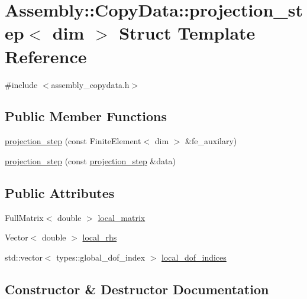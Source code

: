\hypertarget{struct_assembly_1_1_copy_data_1_1projection__step}{}\section{Assembly\+:\+:Copy\+Data\+:\+:projection\+\_\+step$<$ dim $>$ Struct Template Reference}
\label{struct_assembly_1_1_copy_data_1_1projection__step}


{\ttfamily \#include $<$assembly\+\_\+copydata.\+h$>$}

\subsection*{Public Member Functions}
\begin{DoxyCompactItemize}
\item 
\hyperlink{struct_assembly_1_1_copy_data_1_1projection__step_ae9dbb67f437af3436e16fa0f1b4939a4}{projection\+\_\+step} (const Finite\+Element$<$ dim $>$ \&fe\+\_\+auxilary)
\item 
\hyperlink{struct_assembly_1_1_copy_data_1_1projection__step_a3ee7e60d299b6a599cb7a3e87258ed69}{projection\+\_\+step} (const \hyperlink{struct_assembly_1_1_copy_data_1_1projection__step}{projection\+\_\+step} \&data)
\end{DoxyCompactItemize}
\subsection*{Public Attributes}
\begin{DoxyCompactItemize}
\item 
Full\+Matrix$<$ double $>$ \hyperlink{struct_assembly_1_1_copy_data_1_1projection__step_afd29a90013688a947f0100bd4541e1d1}{local\+\_\+matrix}
\item 
Vector$<$ double $>$ \hyperlink{struct_assembly_1_1_copy_data_1_1projection__step_afe718ce6054f5dc781f60bdc2b1bdc82}{local\+\_\+rhs}
\item 
std\+::vector$<$ types\+::global\+\_\+dof\+\_\+index $>$ \hyperlink{struct_assembly_1_1_copy_data_1_1projection__step_a96eade218526cf002d141d536572b75d}{local\+\_\+dof\+\_\+indices}
\end{DoxyCompactItemize}


\subsection{Constructor \& Destructor Documentation}
\hypertarget{struct_assembly_1_1_copy_data_1_1projection__step_ae9dbb67f437af3436e16fa0f1b4939a4}{}
